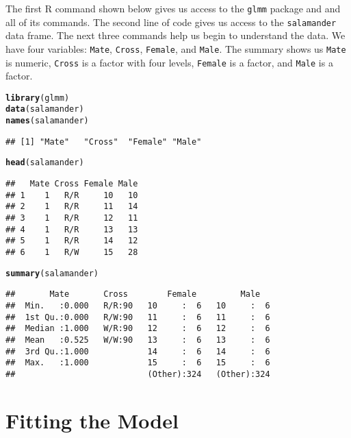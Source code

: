 \documentclass[11pt]{article}\usepackage[]{graphicx}\usepackage[]{color}
\makeatletter
\newcommand{\hlstd}[1]{\textcolor[rgb]{0.345,0.345,0.345}{#1}}%
\newcommand{\hlkwd}[1]{\textcolor[rgb]{0.737,0.353,0.396}{\textbf{#1}}}%
\newenvironment{kframe}{%
 \def\at@end@of@kframe{}%
 \ifinner\ifhmode%
  \def\at@end@of@kframe{\end{minipage}}%
  \begin{minipage}{\columnwidth}%
 \fi\fi%
 \def\FrameCommand##1{\hskip\@totalleftmargin \hskip-\fboxsep
 \colorbox{shadecolor}{##1}\hskip-\fboxsep
     \hskip-\linewidth \hskip-\@totalleftmargin \hskip\columnwidth}%
 \MakeFramed {\advance\hsize-\width
   \@totalleftmargin\z@ \linewidth\hsize
   \@setminipage}}%
 {\par\unskip\endMakeFramed%
 \at@end@of@kframe}
\newenvironment{knitrout}{}{} %
\makeatother
\begin{document}
The first R  command shown below gives us access to the \texttt{glmm} package and and all of its commands. The second line of code gives us access to the \texttt{salamander} data frame.  The next three commands help us begin to understand the data. We have four variables: \texttt{Mate}, \texttt{Cross}, \texttt{Female}, and \texttt{Male}. The summary shows us \texttt{Mate} is numeric, \texttt{Cross} is a factor with four levels, \texttt{Female} is a factor, and \texttt{Male} is a factor. 




\begin{knitrout}
\color{fgcolor}\begin{kframe}
\begin{alltt}
\hlkwd{library}\hlstd{(glmm)}
\hlkwd{data}\hlstd{(salamander)}
\hlkwd{names}\hlstd{(salamander)}
\end{alltt}
\begin{verbatim}
## [1] "Mate"   "Cross"  "Female" "Male"
\end{verbatim}
\begin{alltt}
\hlkwd{head}\hlstd{(salamander)}
\end{alltt}
\begin{verbatim}
##   Mate Cross Female Male
## 1    1   R/R     10   10
## 2    1   R/R     11   14
## 3    1   R/R     12   11
## 4    1   R/R     13   13
## 5    1   R/R     14   12
## 6    1   R/W     15   28
\end{verbatim}
\begin{alltt}
\hlkwd{summary}\hlstd{(salamander)}
\end{alltt}
\begin{verbatim}
##       Mate       Cross        Female         Male    
##  Min.   :0.000   R/R:90   10     :  6   10     :  6  
##  1st Qu.:0.000   R/W:90   11     :  6   11     :  6  
##  Median :1.000   W/R:90   12     :  6   12     :  6  
##  Mean   :0.525   W/W:90   13     :  6   13     :  6  
##  3rd Qu.:1.000            14     :  6   14     :  6  
##  Max.   :1.000            15     :  6   15     :  6  
##                           (Other):324   (Other):324
\end{verbatim}
\end{kframe}
\end{knitrout}



\section{Fitting the Model}\label{sec:fitmod}
\end{document}
